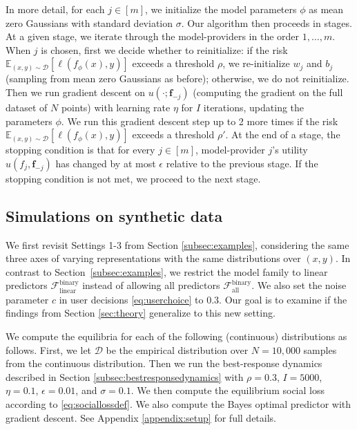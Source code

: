 \documentclass[letterpaper,11pt]{article}
\theoremstyle{plain}
\begin{document}
In more detail, for each $j \in [m]$, we initialize the model parameters $\phi$ 
as mean zero Gaussians with standard deviation $\sigma$. Our algorithm then proceeds in stages. At a given stage, we iterate through the model-providers in the order $1, \ldots, m$. When $j$ is chosen, first we decide whether to reinitialize: if the risk $\mathbb{E}_{(x,y) \sim \mathcal{D}}[\ell(f_{\phi}(x), y)]$ exceeds a threshold $\rho$, we re-initialize $w_j$ and $b_j$ (sampling from mean zero Gaussians as before); otherwise, we do not reinitialize. Then we run gradient descent on $u(\cdot; \mathbf{f}_{-j})$ (computing the gradient on the full dataset of $N$ points) with learning rate $\eta$ for $I$ iterations, updating the parameters $\phi$. We run this gradient descent step up to 2 more times if the risk $\mathbb{E}_{(x,y) \sim \mathcal{D}}[\ell(f_{\phi}(x), y)]$ exceeds a threshold $\rho'$. At the end of a stage, the stopping condition is that for every $j \in [m]$, model-provider $j$'s utility $u(f_j, \mathbf{f}_{-j})$ has changed by at most $\epsilon$ relative to the previous stage. If the stopping condition is not met, we proceed to the next stage. 

\subsection{Simulations on synthetic data}\label{subsec:synthetic}

We first revisit Settings 1-3 from Section \ref{subsec:examples}, considering the same three axes of varying representations with the same distributions over $(x,y)$. In contrast to Section~\ref{subsec:examples}, we restrict the model family to linear predictors $\mathcal{F}^{\text{binary}}_{\text{linear}}$ instead of allowing all predictors $\mathcal{F}^{\text{binary}}_{\text{all}}$. We also set the noise parameter $c$ in user decisions \eqref{eq:userchoice} to $0.3$. Our goal is to examine if the findings from Section \ref{sec:theory} generalize to this new setting. 

We compute the equilibria for each of the following (continuous) distributions as follows. First, we let $\mathcal{D}$ be the empirical distribution over $N = 10,000$ samples from the continuous distribution. Then we run the best-response dynamics described in Section \ref{subsec:bestresponsedynamics} with $\rho = 0.3$, $I = 5000$, $\eta = 0.1$, $\epsilon = 0.01$, and $\sigma = 0.1$. 
We then compute the equilibrium social loss according to \eqref{eq:sociallossdef}.  We also compute the Bayes optimal predictor with gradient descent. See Appendix \ref{appendix:setup} for full details. 
 
\end{document}
